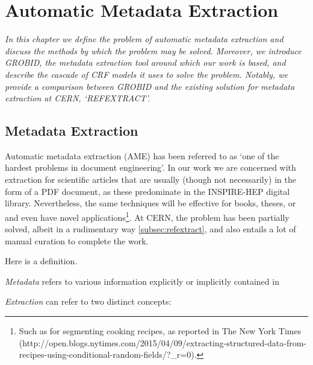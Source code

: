 
\chapter{Automatic Metadata Extraction} %

\label{Chapter3} %



\emph{In this chapter we define the problem of automatic metadata extraction and discuss the methods by which the problem may be solved. Moreover, we introduce GROBID, the metadata extraction tool around which our work is based, and describe the cascade of CRF models it uses to solve the problem. Notably, we provide a comparison between GROBID and the existing solution for metadata extraction at CERN, `REFEXTRACT'.}

\section{Metadata Extraction}

Automatic metadata extraction (AME) has been referred to as `one of the hardest problems in document engineering'. In our work we are concerned with extraction for scientific articles that are usually (though not necessarily) in the form of a PDF document, as these predominate in the INSPIRE-HEP digital library. Nevertheless, the same techniques will be effective for books, theses, or  and even have novel applications\footnote{Such as for segmenting cooking recipes, as reported in The New York Times (http://open.blogs.nytimes.com/2015/04/09/extracting-structured-data-from-recipes-using-conditional-random-fields/?\_r=0).}. At CERN, the problem has been partially solved, albeit in a rudimentary way \ref{subsec:refextract}, and also entails a lot of manual curation to complete the work.

\begin{definition}
Here is a definition.
\end{definition}

\emph{Metadata} refers to various information explicitly or implicitly contained in 

\emph{Extraction} can refer to two distinct concepts:

